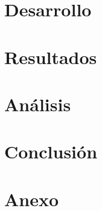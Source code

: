\documentclass[12pt]{article}
\begin{document}
 
\section{Desarrollo}


\section{Resultados}


\section{Análisis}



\section{Conclusión}



\newpage

\section{Anexo}
\end{document}

